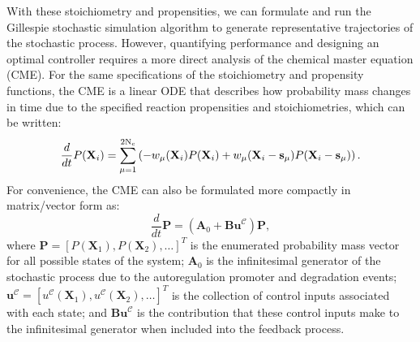 \documentclass[12pt]{article}
\begin{document}
With these stoichiometry and propensities, we can formulate and run the Gillespie stochastic simulation algorithm\cite{Gillespie1992,Gillespie1977} to generate representative trajectories of the stochastic process. However, quantifying performance and designing an optimal controller requires a more direct analysis of the chemical master equation (CME).  For the same specifications of the stoichiometry and propensity functions, the CME is a linear ODE that describes how probability mass changes in time due to the specified reaction propensities and stoichiometries, which can be written:
\begin{equation}
\frac{d}{dt}P(\mathbf{X}_i)=\sum_{\mu=1}^{2{\rm N_c}}
\left(
-w_{\mu}(\mathbf{X}_i)P(\mathbf{X}_i)
+w_{\mu}(\mathbf{X}_i-\mathbf{s}_{\mu})P(\mathbf{X}_i-\mathbf{s}_{\mu})
\right).\label{CMEindex}
\end{equation}
For convenience, the CME can also be formulated more compactly in matrix/vector form as:
\begin{equation}
\frac{d}{dt}\mathbf{P}=(\mathbf{A}_0+\textbf{Bu}^{\mathcal{C}})\mathbf{P},\label{CME}
\end{equation}
where $\mathbf{P} = [P(\mathbf{X}_1), P(\mathbf{X}_2), \ldots ]^T$ is the enumerated probability mass vector for all possible states of the system; $\mathbf{A}_0$ is the infinitesimal generator of the stochastic process due to the autoregulation promoter and degradation events;  $\textbf{u}^{\mathcal{C}} =[u^{\mathcal{C}}(\mathbf{X}_1), u^{\mathcal{C}}(\mathbf{X}_2), \ldots ]^T$ is the collection of control inputs associated with each state; and $\textbf{Bu}^{\mathcal{C}}$ is the contribution that these control inputs make to the infinitesimal generator when included into the feedback process. 
 
\end{document}
